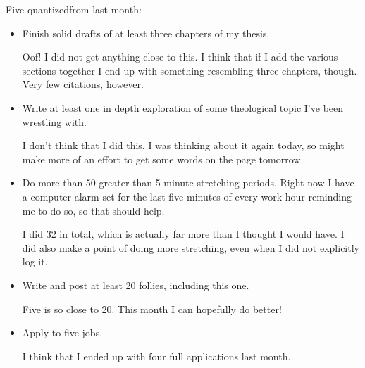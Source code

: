\documentclass[12pt]{article}
\renewcommand{\,}{\textsuperscript{,}}
\begin{document}
Five quantized\goals from last month:  
\begin{itemize}  
\item Finish solid drafts of at least three chapters of my thesis.

Oof! I did not get anything close to this. I think that if I add the various sections together I end up with something resembling three chapters, though.  
Very few citations, however.

\item Write at least one in depth exploration of some theological topic I've been wrestling with.

I don't think that I did this. I was thinking about it again today, so might make more of an effort to get some words on the page tomorrow.

\item Do more than 50 greater than 5 minute stretching periods. Right now I have a computer alarm set for the last five minutes of every work hour reminding me to do so, so that should help.

I did 32 in total, which is actually far more than I thought I would have. I did also make a point of doing more stretching, even when I did not explicitly log it.

\item Write and post at least 20 follies, including this one.

Five is so close to 20. This month I can hopefully do better!  
\item Apply to five jobs.

I think that I ended up with four full applications last month.

\end{itemize}
\end{document}
